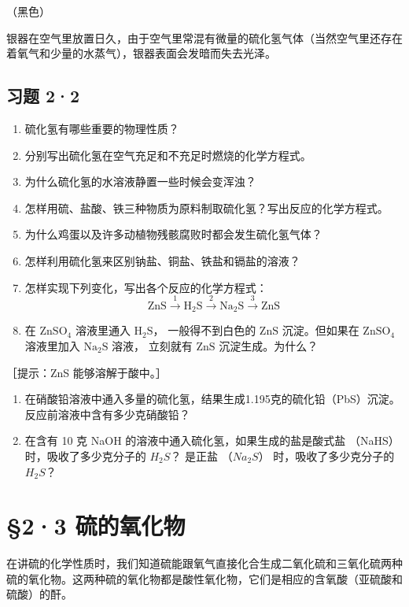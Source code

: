 （黑色）

银器在空气里放置日久，由于空气里常混有微量的硫化氢气体（当然空气里还存在着氧气和少量的水蒸气），银器表面会发暗而失去光泽。

\subsection{习题 2·2}

\begin{enumerate}
\item
  硫化氢有哪些重要的物理性质？
\item
  分别写出硫化氢在空气充足和不充足时燃烧的化学方程式。
\item
  为什么硫化氢的水溶液静置一些时候会变浑浊？
\item
  怎样用硫、盐酸、铁三种物质为原料制取硫化氢？写出反应的化学方程式。
\item
  为什么鸡蛋以及许多动植物残骸腐败时都会发生硫化氢气体？
\item
  怎样利用硫化氢来区别钠盐、铜盐、铁盐和镉盐的溶液？
\item
  怎样实现下列变化，写出各个反应的化学方程式：
\[
\mathrm{ZnS} \xrightarrow {1} \mathrm{H} _ {2} \mathrm{S} \xrightarrow {2} \mathrm{Na} _ {2} \mathrm{S} \xrightarrow {3} \mathrm{ZnS}
\]
\item
  在 \(\mathrm{ZnSO_4}\) 溶液里通入 \(\mathrm{H}_2\mathrm{S}\)，
  一般得不到白色的 \(\mathrm{ZnS}\) 沉淀。但如果在 \(\mathrm{ZnSO_4}\)
  溶液里加入 \(\mathrm{Na_2S}\) 溶液， 立刻就有 \(\mathrm{ZnS}\)
  沉淀生成。为什么？
\end{enumerate}

［提示：ZnS 能够溶解于酸中。］

\begin{enumerate}[start=9]
\item
  在硝酸铅溶液中通入多量的硫化氢，结果生成1.195克的硫化铅（PbS）沉淀。反应前溶液中含有多少克硝酸铅？
\item
  在含有 10 克 NaOH 的溶液中通入硫化氢，如果生成的盐是酸式盐 （NaHS）
  时，吸收了多少克分子的 \(H_{2}S\)？ 是正盐 （\(Na_{2}S\)）
  时，吸收了多少克分子的 \(H_{2}S\)？
\end{enumerate}

\section{§2·3 硫的氧化物}

在讲硫的化学性质时，我们知道硫能跟氧气直接化合生成二氧化硫和三氧化硫两种硫的氧化物。这两种硫的氧化物都是酸性氧化物，它们是相应的含氧酸（亚硫酸和硫酸）的酐。


